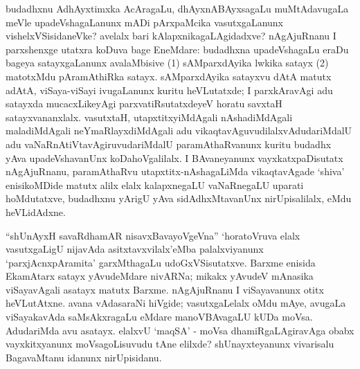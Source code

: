 budadhxnu AdhAyxtimxka AcAragaLu, dhAyxnABAyxsagaLu muMtAdavugaLa meVle upadeVshagaLanunx mADi pArxpaMcika vasutxgaLanunx vishelxVSisidaneVke? avelalx bari kAlapxnikagaLAgidadxve? nAgAjuRnanu I parxshenxge utatxra koDuva bage EneMdare: budadhxna upadeVshagaLu eraDu bageya satayxgaLanunx avalaMbisive (1) sAMparxdAyika lwkika satayx (2) matotxMdu pAramAthiRka satayx. sAMparxdAyika satayxvu dAtA matutx adAtA, viSaya-viSayi ivugaLanunx kuritu heVLutatxde; I parxkAravAgi adu satayxda mucacxLikeyAgi parxvatiRsutatxdeyeV horatu savxtaH satayxvananxlalx. vasutxtaH, utapxtitxyiMdAgali nAshadiMdAgali maladiMdAgali neYmaRlayxdiMdAgali adu vikaqtavAguvudilalxvAdudariMdalU adu vaNaRnAtiVtavAgiruvudariMdalU paramAthaRvanunx kuritu budadhx yAva upadeVshavanUnx koDahoVgalilalx. I BAvaneyanunx vayxkatxpaDisutatx nAgAjuRnanu, paramAthaRvu utapxtitx-nAshagaLiMda vikaqtavAgade `shiva' enisikoMDide matutx alilx elalx kalapxnegaLU vaNaRnegaLU uparati hoMdutatxve, budadhxnu yArigU yAva sidAdhxMtavanUnx nirUpisalilalx, eMdu heVLidAdxne.

``shUnAyxH savaRdhamAR nisavxBavayoVgeVna'' `horatoVruva elalx vasutxgaLigU nijavAda asitxtavxvilalx'eMba palalxviyanunx `parxjAcnxpAramita' garxMthagaLu udoGxVSisutatxve. Barxme enisida EkamAtarx satayx yAvudeMdare nivARNa; mikakx yAvudeV mAnasika viSayavAgali asatayx matutx Barxme. nAgAjuRnanu I viSayavanunx otitx heVLutAtxne. avana vAdasaraNi hiVgide; vasutxgaLelalx oMdu mAye, avugaLa viSayakavAda saMsAkxragaLu eMdare manoVBAvagaLU kUDa moVsa. AdudariMda avu asatayx. elalxvU `maqSA' - moVsa dhamiRgaLAgiravAga obabx vayxkitxyanunx moVsagoLisuvudu tAne elilxde? shUnayxteyanunx vivarisalu BagavaMtanu idanunx nirUpisidanu.

